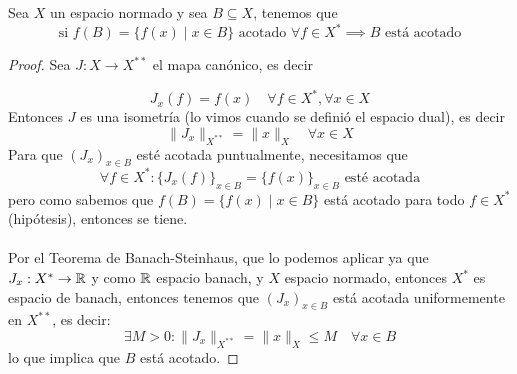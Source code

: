 \begin{coro}
    Sea $X$ un espacio normado y sea $B \subseteq X$, tenemos que
    \begin{equation*}
        \text{si } f(B)=\{f(x) \mid x \in B\} \text{ acotado } \forall f \in X^* \implies B \text{ está acotado}
    \end{equation*}
\begin{proof}
    Sea $J: X \to X^{**}$ el mapa canónico, es decir
    
    $$J_x(f) = f(x) \quad \forall f \in X^*, \forall x \in X$$
    Entonces $J$ es una isometría (lo vimos cuando se definió el espacio dual), es decir
    $$\|J_x\|_{X^{**}} = \|x\|_X \quad \forall x \in X$$
    \noindent
    Para que $(J_x)_{x\in B}$ esté acotada puntualmente, necesitamos que 
    \begin{equation*}
        \forall f\in X^* : \{J_x(f)\}_{x\in B} = \{f(x)\}_{x\in B} \text{ esté acotada}
    \end{equation*}
    pero como sabemos que $f(B) = \{f(x) \mid x \in B\}$ está acotado para todo $f \in X^*$ (hipótesis), entonces se tiene. \\ \\
    \noindent
    Por el Teorema de Banach-Steinhaus, que lo podemos aplicar ya que $J_x:X^* \to \mathbb{R}$ y como $\mathbb{R}$ espacio banach, y $X$ espacio normado, entonces $X^*$ es espacio de banach, entonces tenemos que $(J_x)_{x \in B}$ está acotada uniformemente en $X^{**}$, es decir:
    \begin{equation*}
        \exists M > 0 : \|J_x\|_{X^{**}} = \|x\|_X \leq M \quad \forall x \in B
    \end{equation*}
    lo que implica que $B$ está acotado.
\end{proof}
\end{coro}

